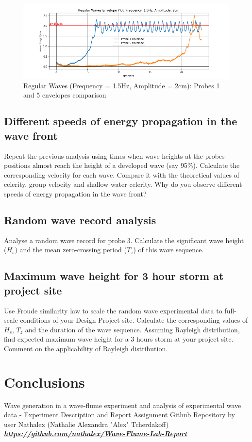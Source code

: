 \documentclass{article}
\begin{document}
	\vspace{-.5cm}
	\begin{figure}[H]
		\centering
		\includegraphics[clip, trim = {1cm 0.2cm 1cm 0.5cm},width=\textwidth]{../graphs/F15A2Probes1and5Envelope.png}
		\caption{Regular Waves (Frequency = 1.5Hz, Amplitude = 2cm): Probes 1 and 5 envelopes comparison}
		\label{f15a2envelopes}
	\end{figure}
	\subsection{Different speeds of energy propagation in the wave front}
	Repeat the previous analysis using times when wave heights at the probes positions	almost reach the height of a developed wave (say 95\%). Calculate the corresponding velocity for each wave. Compare it with the theoretical values of celerity, group velocity and shallow water celerity. Why do you observe different speeds of energy propagation in the wave front?
	\subsection{Random wave record analysis}
	Analyse a random wave record for probe 3. Calculate the significant wave height	($H_s$) and the mean zero-crossing period ($T_z$) of this wave sequence.
	\subsection{Maximum wave height for 3 hour storm at project site}
	Use Froude similarity law to scale the random wave experimental data to full-scale	conditions of your Design Project site. Calculate the corresponding values of $H_s$, $T_z$ and the duration of the wave sequence. Assuming Rayleigh distribution, find	expected maximum wave height for a 3 hours storm at your project site. Comment on the applicability of Rayleigh distribution.
	\section{Conclusions}
	\begin{thebibliography}{1}
		 Wave generation in a wave-flume experiment and analysis of experimental wave data - Experiment Description and Report Assignment
		 Github Repository by user Nathalex (Nathalie Alexandra "Alex" Tcherdakoff)\\ \href{https://github.com/nathalex/Wave-Flume-Lab-Report}{\textbf{\textit{https://github.com/nathalex/Wave-Flume-Lab-Report}}}
	\end{thebibliography}
\end{document}

